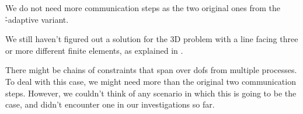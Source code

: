 We do not need more communication steps as the two original ones from the \h-adaptive variant.

We still haven't figured out a solution for the 3D problem with a line facing three or more different finite elements, as explained in \textcite[Sec.~?.?]{bangerth2009}.

There might be chains of constraints that span over \glspl{dof} from multiple processes. To deal with this case, we might need more than the original two communication steps. However, we couldn't think of any scenario in which this is going to be the case, and didn't encounter one in our investigations so far.
